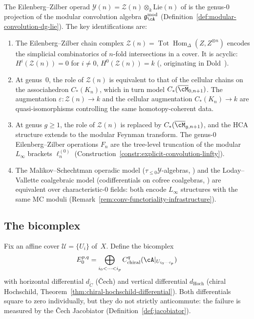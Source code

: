 \begin{remark}
\label{rem:ez-operad-convolution}
The Eilenberg--Zilber operad
$\mathcal{Y}(n) = \mathcal{Z}(n) \otimes_k \mathrm{Lie}(n)$
of \cite{MS24} is the genus-$0$ projection of the modular
convolution algebra
$\mathfrak{g}^{\mathrm{mod}}_\cA$
(Definition~\ref{def:modular-convolution-dg-lie}). The key
identifications are:
\begin{enumerate}[label=\textup{(\roman*)}]
\item The Eilenberg--Zilber chain complex $\mathcal{Z}(n) =
 \operatorname{Tot}\operatorname{Hom}_\Delta(Z, Z^{\otimes n})$
 encodes the simplicial combinatorics of $n$-fold intersections
 in a cover. It is acyclic: $H^i(\mathcal{Z}(n)) = 0$ for
 $i \neq 0$, $H^0(\mathcal{Z}(n)) = k$
 (\cite[\S2.5]{MS24}, originating in Dold~\cite{Dold61}).
\item At genus~$0$, the role of $\mathcal{Z}(n)$ is equivalent
 to that of the cellular chains on the associahedron
 $C_*(K_n)$, which in turn model
 $C_*(\overline{\cM}_{0,n+1})$. The augmentation
 $\varepsilon\colon \mathcal{Z}(n) \to k$ and the cellular
 augmentation $C_*(K_n) \to k$ are quasi-isomorphisms controlling
 the same homotopy-coherent data.
\item At genus $g \geq 1$, the role of $\mathcal{Z}(n)$ is
 replaced by $C_*(\overline{\cM}_{g,n+1})$, and the HCA
 structure extends to the modular Feynman transform. The
 genus-$0$ Eilenberg--Zilber operations $F_n$ are the tree-level
 truncation of the modular $L_\infty$ brackets $\ell_n^{(0)}$
 (Construction~\ref{constr:explicit-convolution-linfty}).
\item The Malikov--Schechtman operadic model
 ($\tau_{\leq 0}\mathcal{Y}$-algebras, \cite[\S2.6]{MS24}) and
 the Loday--Vallette coalgebraic model (codifferentials on cofree
 coalgebras, \cite[\S10.3]{LV12}) are equivalent over
 characteristic-$0$ fields: both encode $L_\infty$ structures
 with the same MC moduli
 (Remark~\ref{rem:conv-functoriality-infrastructure}).
\end{enumerate}
\end{remark}

\subsection{The bicomplex}
\label{subsec:hochschild-cech-bicomplex}

Fix an affine cover $\mathcal{U} = \{U_i\}$ of~$X$. Define
the bicomplex
\[
E_0^{p,q}
= \bigoplus_{i_0 < \cdots < i_p}
 C^q_{\mathrm{chiral}}(\cA|_{U_{i_0\cdots i_p}})
\]
with horizontal differential $d_{\check{C}}$ (\v{C}ech) and
vertical differential $d_{\mathrm{Hoch}}$ (chiral Hochschild,
Theorem~\ref{thm:chiral-hochschild-differential}). Both
differentials square to zero individually, but they do not
strictly anticommute: the failure is measured by the \v{C}ech
Jacobiator (Definition~\ref{def:jacobiator}).

